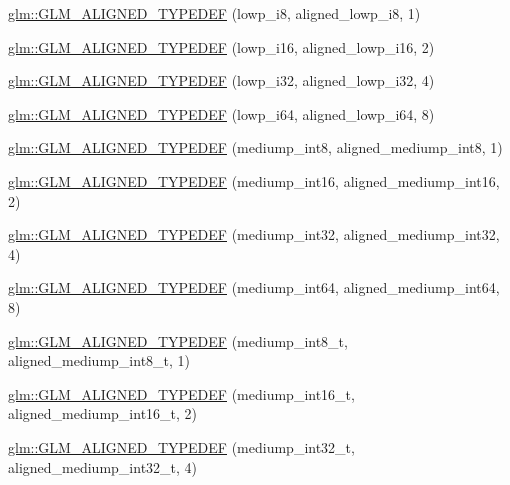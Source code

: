\begin{DoxyCompactItemize}
\item 
\hyperlink{group__gtx__type__aligned_gac20d508d2ef5cc95ad3daf083c57ec2a}{glm\+::\+G\+L\+M\+\_\+\+A\+L\+I\+G\+N\+E\+D\+\_\+\+T\+Y\+P\+E\+D\+E\+F} (lowp\+\_\+i8, aligned\+\_\+lowp\+\_\+i8, 1)
\item 
\hyperlink{group__gtx__type__aligned_ga50257b48069a31d0c8d9c1f644d267de}{glm\+::\+G\+L\+M\+\_\+\+A\+L\+I\+G\+N\+E\+D\+\_\+\+T\+Y\+P\+E\+D\+E\+F} (lowp\+\_\+i16, aligned\+\_\+lowp\+\_\+i16, 2)
\item 
\hyperlink{group__gtx__type__aligned_gaa07e98e67b7a3435c0746018c7a2a839}{glm\+::\+G\+L\+M\+\_\+\+A\+L\+I\+G\+N\+E\+D\+\_\+\+T\+Y\+P\+E\+D\+E\+F} (lowp\+\_\+i32, aligned\+\_\+lowp\+\_\+i32, 4)
\item 
\hyperlink{group__gtx__type__aligned_ga62601fc6f8ca298b77285bedf03faffd}{glm\+::\+G\+L\+M\+\_\+\+A\+L\+I\+G\+N\+E\+D\+\_\+\+T\+Y\+P\+E\+D\+E\+F} (lowp\+\_\+i64, aligned\+\_\+lowp\+\_\+i64, 8)
\item 
\hyperlink{group__gtx__type__aligned_gac8cff825951aeb54dd846037113c72db}{glm\+::\+G\+L\+M\+\_\+\+A\+L\+I\+G\+N\+E\+D\+\_\+\+T\+Y\+P\+E\+D\+E\+F} (mediump\+\_\+int8, aligned\+\_\+mediump\+\_\+int8, 1)
\item 
\hyperlink{group__gtx__type__aligned_ga78f443d88f438575a62b5df497cdf66b}{glm\+::\+G\+L\+M\+\_\+\+A\+L\+I\+G\+N\+E\+D\+\_\+\+T\+Y\+P\+E\+D\+E\+F} (mediump\+\_\+int16, aligned\+\_\+mediump\+\_\+int16, 2)
\item 
\hyperlink{group__gtx__type__aligned_ga0680cd3b5d4e8006985fb41a4f9b57af}{glm\+::\+G\+L\+M\+\_\+\+A\+L\+I\+G\+N\+E\+D\+\_\+\+T\+Y\+P\+E\+D\+E\+F} (mediump\+\_\+int32, aligned\+\_\+mediump\+\_\+int32, 4)
\item 
\hyperlink{group__gtx__type__aligned_gad9e5babb1dd3e3531b42c37bf25dd951}{glm\+::\+G\+L\+M\+\_\+\+A\+L\+I\+G\+N\+E\+D\+\_\+\+T\+Y\+P\+E\+D\+E\+F} (mediump\+\_\+int64, aligned\+\_\+mediump\+\_\+int64, 8)
\item 
\hyperlink{group__gtx__type__aligned_ga353fd9fa8a9ad952fcabd0d53ad9a6dd}{glm\+::\+G\+L\+M\+\_\+\+A\+L\+I\+G\+N\+E\+D\+\_\+\+T\+Y\+P\+E\+D\+E\+F} (mediump\+\_\+int8\+\_\+t, aligned\+\_\+mediump\+\_\+int8\+\_\+t, 1)
\item 
\hyperlink{group__gtx__type__aligned_ga2196442c0e5c5e8c77842de388c42521}{glm\+::\+G\+L\+M\+\_\+\+A\+L\+I\+G\+N\+E\+D\+\_\+\+T\+Y\+P\+E\+D\+E\+F} (mediump\+\_\+int16\+\_\+t, aligned\+\_\+mediump\+\_\+int16\+\_\+t, 2)
\item 
\hyperlink{group__gtx__type__aligned_ga1284488189daf897cf095c5eefad9744}{glm\+::\+G\+L\+M\+\_\+\+A\+L\+I\+G\+N\+E\+D\+\_\+\+T\+Y\+P\+E\+D\+E\+F} (mediump\+\_\+int32\+\_\+t, aligned\+\_\+mediump\+\_\+int32\+\_\+t, 4)

\end{DoxyCompactItemize}
